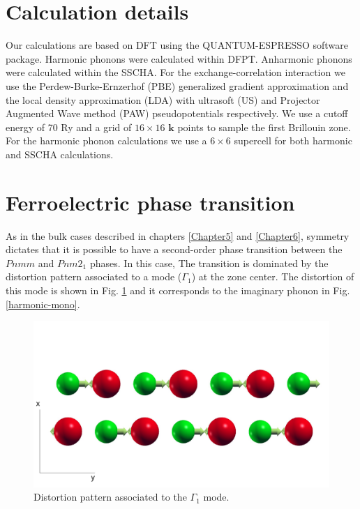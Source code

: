\section{Calculation details}

Our calculations are based on DFT using the QUANTUM-ESPRESSO\cite{giannozzi2009quantum} software package. Harmonic 
phonons were calculated within DFPT. Anharmonic phonons were calculated within the SSCHA. For the 
exchange-correlation interaction we use the Perdew-Burke-Ernzerhof (PBE) generalized gradient approximation and the 
local density approximation (LDA) with ultrasoft (US) and Projector Augmented Wave method (PAW) pseudopotentials 
respectively. We use a cutoff energy of 70 Ry and a grid of $16\times16$ $\boldsymbol{k}$ points to sample the first 
Brillouin zone. For the harmonic phonon calculations we use a $6\times6$ supercell for both harmonic and SSCHA 
calculations.

\section{Ferroelectric phase transition}

As in the bulk cases described in chapters \ref{Chapter5} and \ref{Chapter6}, 
symmetry\cite{orobengoa2009amplimodes,perez2010mode} dictates that it is possible to have a second-order phase 
transition between the $Pnmm$ and $Pnm2_{1}$ phases. In this case, The transition is dominated by the distortion 
pattern associated to a mode ($\Gamma_{1}$) at the zone center. The distortion of this 
mode is shown in Fig. \ref{transition-mono} and it corresponds to the imaginary phonon in 
Fig. \ref{harmonic-mono}. \\
\begin{figure}[h]
\includegraphics[width=\linewidth]{Figures/transition-mono.pdf}
	\caption{Distortion pattern associated to the $\Gamma_{1}$ mode.}
\label{transition-mono}
\end{figure}

